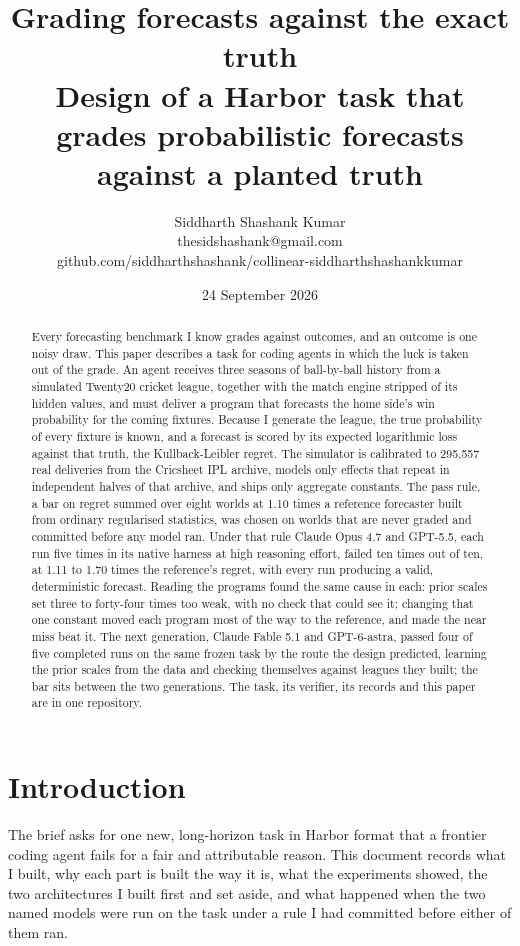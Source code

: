 \documentclass[11pt,letterpaper]{article}
\title{\LARGE\bfseries Grading forecasts against the exact truth\\[6pt]\large Design of a Harbor task that grades probabilistic forecasts against a planted truth}
\author{Siddharth Shashank Kumar\\ \small thesidshashank@gmail.com\\ \small github.com/siddharthshashank/collinear-siddharthshashankkumar}
\date{24 September 2026}
\begin{document}
\maketitle
\begin{abstract}
Every forecasting benchmark I know grades against outcomes, and an outcome is one noisy draw. This paper describes a task for coding agents in which the luck is taken out of the grade. An agent receives three seasons of ball-by-ball history from a simulated Twenty20 cricket league, together with the match engine stripped of its hidden values, and must deliver a program that forecasts the home side's win probability for the coming fixtures. Because I generate the league, the true probability of every fixture is known, and a forecast is scored by its expected logarithmic loss against that truth, the Kullback-Leibler regret. The simulator is calibrated to 295,557 real deliveries from the Cricsheet IPL archive, models only effects that repeat in independent halves of that archive, and ships only aggregate constants. The pass rule, a bar on regret summed over eight worlds at 1.10 times a reference forecaster built from ordinary regularised statistics, was chosen on worlds that are never graded and committed before any model ran. Under that rule Claude Opus 4.7 and GPT-5.5, each run five times in its native harness at high reasoning effort, failed ten times out of ten, at 1.11 to 1.70 times the reference's regret, with every run producing a valid, deterministic forecast. Reading the programs found the same cause in each: prior scales set three to forty-four times too weak, with no check that could see it; changing that one constant moved each program most of the way to the reference, and made the near miss beat it. The next generation, Claude Fable 5.1 and GPT-6-astra, passed four of five completed runs on the same frozen task by the route the design predicted, learning the prior scales from the data and checking themselves against leagues they built; the bar sits between the two generations. The task, its verifier, its records and this paper are in one repository.
\end{abstract}
\tableofcontents
\clearpage
\section{Introduction}

The brief asks for one new, long-horizon task in Harbor format that a frontier coding agent fails for a fair and attributable reason. This document records what I built, why each part is built the way it is, what the experiments showed, the two architectures I built first and set aside, and what happened when the two named models were run on the task under a rule I had committed before either of them ran.
\end{document}
